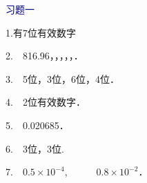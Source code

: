 \thispagestyle{empty}
\vspace*{2.2cm}
\centerline{\hei{\color{darkblue}{部分习题答案}}}

\vspace{2cm}\centerline{\textcolor{darkblue}{\hei{} 习题一}}\vspace{0.5cm}


1.有7位有效数字

2.~~816.96，，，，，．

3.~~5位，3位，6位，4位．

4.~~2位有效数字．

5.~~0.020685．

6.~~3位，3位.

7.~~$0.5\times10^{-4}$,~~~~~~$0.8\times10^{-2}$．


